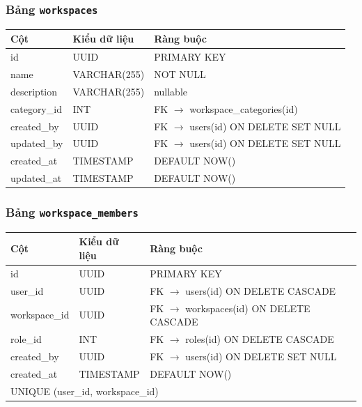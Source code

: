\subsubsection*{Bảng \texttt{workspaces}}
\begin{table}[H]
\centering
\begin{tabularx}{\textwidth}{|l|l|X|}
\hline
\rowcolor{gray!20}
\textbf{Cột} & \textbf{Kiểu dữ liệu} & \textbf{Ràng buộc} \\
\hline
id & UUID & PRIMARY KEY \\
\hline
name & VARCHAR(255) & NOT NULL \\
\hline
description & VARCHAR(255) & nullable \\
\hline
category\_id & INT & FK $\rightarrow$ workspace\_categories(id) \\
\hline
created\_by & UUID & FK $\rightarrow$ users(id) ON DELETE SET NULL \\
\hline
updated\_by & UUID & FK $\rightarrow$ users(id) ON DELETE SET NULL \\
\hline
created\_at & TIMESTAMP & DEFAULT NOW() \\
\hline
updated\_at & TIMESTAMP & DEFAULT NOW() \\
\hline
\end{tabularx}
\end{table}

\subsubsection*{Bảng \texttt{workspace\_members}}
\begin{table}[H]
\centering
\begin{tabularx}{\textwidth}{|l|l|X|}
\hline
\rowcolor{gray!20}
\textbf{Cột} & \textbf{Kiểu dữ liệu} & \textbf{Ràng buộc} \\
\hline
id & UUID & PRIMARY KEY \\
\hline
user\_id & UUID & FK $\rightarrow$ users(id) ON DELETE CASCADE \\
\hline
workspace\_id & UUID & FK $\rightarrow$ workspaces(id) ON DELETE CASCADE \\
\hline
role\_id & INT & FK $\rightarrow$ roles(id) ON DELETE CASCADE \\
\hline
created\_by & UUID & FK $\rightarrow$ users(id) ON DELETE SET NULL \\
\hline
created\_at & TIMESTAMP & DEFAULT NOW() \\
\hline
\multicolumn{3}{|l|}{UNIQUE (user\_id, workspace\_id)} \\
\hline
\end{tabularx}
\end{table}

